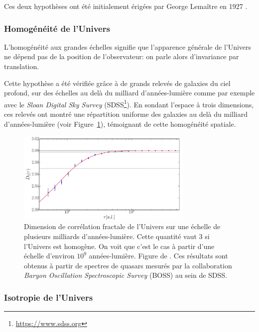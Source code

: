 \documentclass[../main/main.tex]{subfiles}
\begin{document}
Ces deux hypothèses ont été initialement érigées par George Lemaître
en 1927 \citep{Lemaitre1927}.

\subsubsection{Homogénéité de l'Univers}
L'homogénéité aux grandes échelles signifie que l'apparence générale de
l'Univers ne dépend pas de la position de l'observateur: on parle alors
d'invariance par translation.

Cette hypothèse a été vérifiée grâce à de grands relevés de galaxies du
ciel profond, sur des échelles au delà du milliard d'années-lumière
comme par exemple avec le \textit{Sloan Digital Sky Survey}
(SDSS\footnote{\url{https://www.sdss.org}}).
En sondant l'espace à trois dimensions, ces relevés ont montré une
répartition uniforme des galaxies au delà du milliard d'années-lumière
(voir Figure~\ref{fig:homogenesdss}), témoignant de cette homogénéité spatiale.

\begin{figure}[ht]
  \centering
  \includegraphics[width=0.75\textwidth]{../figures/01_cosmology/homogeneunivers.pdf}
  \caption[Dimension de corrélation fractale de l’Univers.]{Dimension de
    corrélation fractale de l’Univers sur une échelle de plusieurs
    milliards d'années-lumière. Cette quantité vaut 3 si l’Univers est
    homogène. On voit que c’est le cas à partir d’une échelle d’environ
    $10^{9}$ années-lumière. Figure de \citet{Laurent2016}. Ces
    résultats sont obtenus à partir de spectres de quasars mesurés par
    la collaboration \textit{Baryon Oscillation Spectroscopic Survey} (BOSS) au sein de SDSS.}
\label{fig:homogenesdss}
\end{figure}

\subsubsection{Isotropie de l'Univers}
\end{document}
